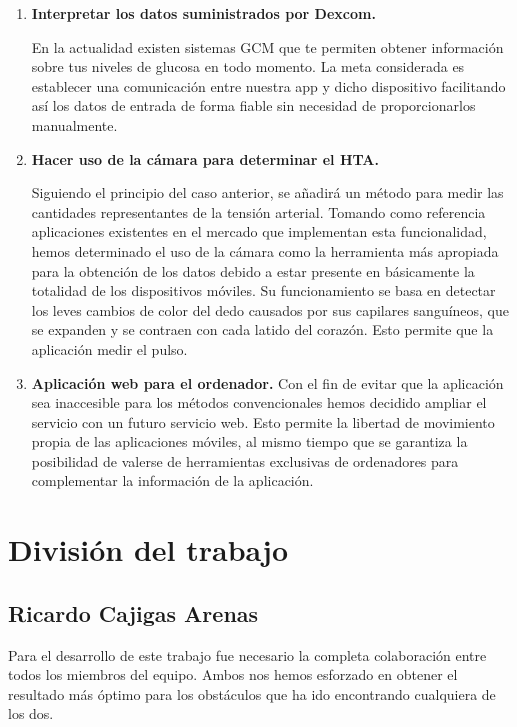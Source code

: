 \documentclass[11pt,spanish,
		listoftables,listoffigures]
		{tfgplantilla}
\begin{document}
\begin{enumerate}
	\item \textbf {Interpretar los datos suministrados por Dexcom.}

En la actualidad existen sistemas GCM que te permiten obtener información sobre tus niveles de glucosa en todo momento. La meta considerada es establecer una comunicación entre nuestra app y dicho dispositivo facilitando así los datos de entrada de forma fiable sin necesidad de proporcionarlos manualmente.

	\item \textbf {Hacer uso de la cámara para determinar el HTA.} 

Siguiendo el principio del caso anterior, se añadirá un método para medir las cantidades representantes de la tensión arterial. Tomando como referencia aplicaciones existentes en el mercado que implementan esta funcionalidad, hemos determinado el uso de la cámara como la herramienta más apropiada para la obtención de los datos debido a estar presente en básicamente la totalidad de los dispositivos móviles. Su funcionamiento se basa en detectar los leves cambios de color del dedo causados por sus capilares sanguíneos, que se expanden y se contraen con cada latido del corazón. Esto permite que la aplicación medir el pulso.

	\item \textbf {Aplicación web para el ordenador.}
Con el fin de evitar que la aplicación sea inaccesible para los métodos convencionales hemos decidido ampliar el servicio con un futuro servicio web. Esto permite la libertad de movimiento propia de las aplicaciones móviles, al mismo tiempo que se garantiza la posibilidad de valerse de herramientas exclusivas de ordenadores para complementar la información de la aplicación.
\end{enumerate}


\chapter{División del trabajo}

\section{Ricardo Cajigas Arenas}
Para el desarrollo de este trabajo fue necesario la completa colaboración entre todos los miembros del equipo. Ambos nos hemos esforzado en obtener el resultado más óptimo para los obstáculos que ha ido encontrando cualquiera de los dos.
\end{document}
